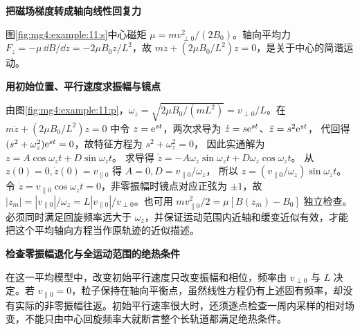 \begin{solution}\textbf{把磁场梯度转成轴向线性回复力}\par\nobreak
图\ref{fig:mg4:example:11:s}中心磁矩 $\mu=mv_{\perp0}^2/(2B_0)$。轴向平均力 $F_z=-\mu\,\dd B/\dd z=-2\mu B_0z/L^2$，故 $m\ddot z+(2\mu B_0/L^2)z=0$，是关于中心的简谐运动。



\par\medskip{}\noindent\textbf{用初始位置、平行速度求振幅与镜点}\par\nobreak
由图\ref{fig:mg4:example:11:p}，$\omega_z=\sqrt{2\mu B_0/(mL^2)}=v_{\perp0}/L$。在 $m\ddot z+(2\mu B_0/L^2)z=0$ 中令
$z=\mathrm e^{st}$，两次求导为 $\dot z=s\mathrm e^{st}$、$\ddot z=s^2\mathrm e^{st}$，
代回得 $(s^2+\omega_z^2)\mathrm e^{st}=0$，故特征方程为 $s^2+\omega_z^2=0$，
因此实通解为 $z=A\cos\omega_zt+D\sin\omega_zt$。
求导得 $\dot z=-A\omega_z\sin\omega_zt+D\omega_z\cos\omega_zt$。
从 $z(0)=0,\dot z(0)=v_{\parallel0}$ 得 $A=0,D=v_{\parallel0}/\omega_z$，
所以 $z=(v_{\parallel0}/\omega_z)\sin\omega_zt$。令 $\dot z=v_{\parallel0}\cos\omega_zt=0$，非零振幅时镜点对应正弦为 $\pm1$，故 $|z_m|=|v_{\parallel0}|/\omega_z=L|v_{\parallel0}|/v_{\perp0}$。也可用 $mv_{\parallel0}^2/2=\mu[B(z_m)-B_0]$ 独立检查。必须同时满足回旋频率远大于 $\omega_z$，并保证运动范围内近轴和缓变近似有效，才能把这个平均轴向方程当作原轨迹的近似描述。



\par\medskip{}\noindent\textbf{检查零振幅退化与全运动范围的绝热条件}\par\nobreak
在这一平均模型中，改变初始平行速度只改变振幅和相位，频率由 $v_{\perp0}$ 与 $L$ 决定。若 $v_{\parallel0}=0$，粒子保持在轴向平衡点，虽然线性方程仍有上述固有频率，却没有实际的非零振幅往返。初始平行速率很大时，还须逐点检查一周内采样的相对场变，不能只由中心回旋频率大就断言整个长轨道都满足绝热条件。\end{solution}
